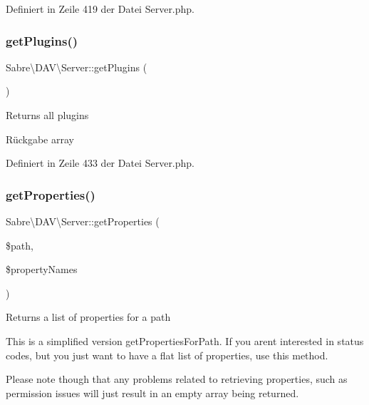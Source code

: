 Definiert in Zeile 419 der Datei Server.\+php.

\mbox{\label{class_sabre_1_1_d_a_v_1_1_server_a0c55cbad92d7945dbe8ebed13cce6755}} 
\subsubsection{\texorpdfstring{get\+Plugins()}{getPlugins()}}
{\footnotesize\ttfamily Sabre\textbackslash{}\+D\+A\+V\textbackslash{}\+Server\+::get\+Plugins (\begin{DoxyParamCaption}{ }\end{DoxyParamCaption})}

Returns all plugins

\begin{DoxyReturn}{Rückgabe}
array 
\end{DoxyReturn}


Definiert in Zeile 433 der Datei Server.\+php.

\mbox{\label{class_sabre_1_1_d_a_v_1_1_server_afee03b6eff812fb064b525db24bbd427}} 
\subsubsection{\texorpdfstring{get\+Properties()}{getProperties()}}
{\footnotesize\ttfamily Sabre\textbackslash{}\+D\+A\+V\textbackslash{}\+Server\+::get\+Properties (\begin{DoxyParamCaption}\item[{}]{\$path,  }\item[{}]{\$property\+Names }\end{DoxyParamCaption})}

Returns a list of properties for a path

This is a simplified version get\+Properties\+For\+Path. If you aren\textquotesingle{}t interested in status codes, but you just want to have a flat list of properties, use this method.

Please note though that any problems related to retrieving properties, such as permission issues will just result in an empty array being returned.


